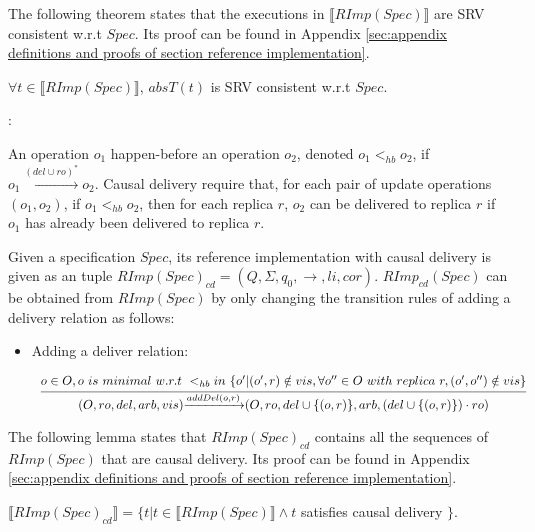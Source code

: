 The following theorem states that the executions in $\llbracket RImp(Spec) \rrbracket$ are SRV consistent w.r.t $Spec$. Its proof can be found in Appendix \ref{sec:appendix definitions and proofs of section reference implementation}.

\begin{theorem}
\label{lemma:executions of reference implementation are SRV consistent}
$\forall t \in \llbracket RImp(Spec) \rrbracket$, $absT(t)$ is SRV consistent w.r.t $Spec$.
\end{theorem}


:

An operation $o_1$ happen-before \cite{Lamport:1978} an operation $o_2$, denoted $o_1 <_{hb} o_2$, if $o_1 {\xrightarrow{ (del \cup ro)^* }} o_2$. Causal delivery require that, for each pair of update operations $(o_1,o_2)$, if $o_1 <_{hb} o_2$, then for each replica $r$, $o_2$ can be delivered to replica $r$ if $o_1$ has already been delivered to replica $r$.

Given a specification $Spec$, its reference implementation with causal delivery is given as an tuple $RImp(Spec)_{\textit{cd}} = (Q,\Sigma,q_0,\rightarrow,li,cor)$. $RImp_{\textit{cd}}(Spec)$ can be obtained from $RImp(Spec)$ by only changing the transition rules of adding a delivery relation as follows:

\begin {itemize}
\setlength{\itemsep}{0.5pt}
\item[-] Adding a deliver relation:

$\begin{array}{l c} \bigfrac{o \in O, o \ is \ minimal \ w.r.t \ <_{hb} in \ \{ o' \vert (o',r) \notin vis, \forall o'' \in O \ with \ replica \ r, (o',o'') \notin vis \}} {(O,ro,del,arb,vis) {\xrightarrow{addDel(o,r)}} (O,ro,del \cup \{ (o,r) \},arb,(del \cup \{ (o,r) \}) \cdot ro)} \end{array}$

\end{itemize}

The following lemma states that $RImp(Spec)_{\textit{cd}}$ contains all the sequences of $RImp(Spec)$ that are causal delivery. Its proof can be found in Appendix \ref{sec:appendix definitions and proofs of section reference implementation}.

\begin{lemma}
\label{lemma:RImpcdSpec contains all the sequences of RImpSpec that are causal delivery}
$\llbracket RImp(Spec)_{\textit{cd}} \rrbracket = \{ t \vert t \in \llbracket RImp(Spec) \rrbracket \wedge t$ satisfies causal delivery $\}$.
\end{lemma}



